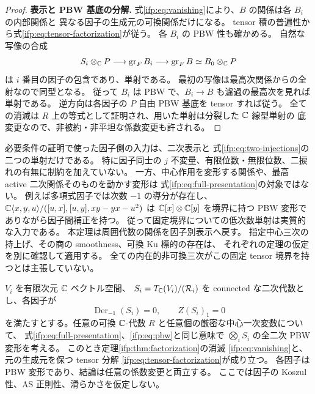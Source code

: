 \begin{proof}
\textbf{表示と PBW 基底の分解.}
式\eqref{ifp:eq:vanishing}により、$B$ の関係は各 $B_i$ の内部関係と
異なる因子の生成元の可換関係だけになる。
tensor 積の普遍性から式\eqref{ifp:eq:tensor-factorization}が従う。
各 $B_i$ の PBW 性も確かめる。
自然な写像の合成
\[
 S_i\otimes_{\mathbb C}P\longrightarrow\operatorname{gr}_F B_i
          \longrightarrow\operatorname{gr}_F B
                 \simeq B_0\otimes_{\mathbb C}P
\]
は $i$ 番目の因子の包含であり、単射である。
最初の写像は最高次関係からの全射なので同型となる。
従って $B_i$ は PBW で、$B_i\to B$ も濾過の最高次を見れば単射である。
逆方向は各因子の $P$ 自由 PBW 基底を tensor すれば従う。
全ての消滅は $R$ 上の等式として証明され、用いた単射は分裂した $\mathbb C$ 線型単射の
底変更なので、非被約・非平坦な係数変更も許される。
\end{proof}

\begin{remark}[仮定と到達範囲]
\label{ifp:rem:scope}
必要条件の証明で使った因子側の入力は、二次表示と
式\eqref{ifp:eq:two-injections}の二つの単射だけである。
特に因子同士の $j$ 不変量、有限位数・無限位数、二捩れの有無に制約を加えていない。
一方、中心作用を変形する関係や、最高 active 二次関係そのものを動かす変形は
式\eqref{ifp:eq:full-presentation}の対象ではない。
例えば多項式因子では次数 $-1$ の導分が存在し、
$\mathbb C\langle x,y,u\rangle/([u,x],[u,y],xy-yx-u^2)$ は
$\mathbb C[x]\otimes\mathbb C[y]$ を境界に持つ PBW 変形でありながら因子間補正を持つ。
従って固定境界についての低次数単射は実質的な入力である。
本定理は周囲代数の関係を因子別表示へ戻す。
指定中心三次の持上げ、その商の smoothness、可換 Ku 標的の存在は、
それぞれの定理の仮定を別に確認して適用する。
全ての内在的非可換三次がこの固定 tensor 境界を持つとは主張していない。
\end{remark}

\begin{corollary}[一般の二次代数に対する因子分解]
\label{ifp:cor:abstract-factorization}
$V_i$ を有限次元 $\mathbb C$ ベクトル空間、
$S_i=T_{\mathbb C}(V_i)/(\mathcal R_i)$ を connected な二次代数とし、各因子が
\[
             \operatorname{Der}_{-1}(S_i)=0,
                         \qquad Z(S_i)_1=0
\]
を満たすとする。任意の可換 $\mathbb C$-代数 $R$ と任意個の厳密な中心一次変数について、
式\eqref{ifp:eq:full-presentation}、\eqref{ifp:eq:pbw}と同じ意味で
$\bigotimes_iS_i$ の全二次 PBW 変形を考える。
このとき定理\ref{ifp:thm:factorization}の消滅
\eqref{ifp:eq:vanishing}と、元の生成元を保つ tensor 分解
\eqref{ifp:eq:tensor-factorization}が成り立つ。
各因子は PBW 変形であり、結論は任意の係数変更と両立する。
ここでは因子の Koszul 性、AS 正則性、滑らかさを仮定しない。
\end{corollary}

